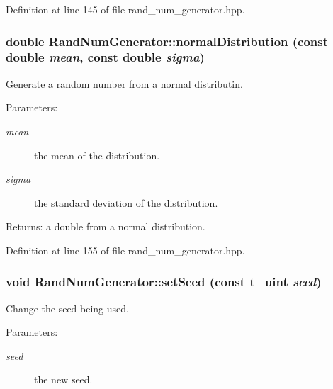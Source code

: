 Definition at line 145 of file rand\_\-num\_\-generator.hpp.
\subsubsection{\setlength{\rightskip}{0pt plus 5cm}double Rand\-Num\-Generator::normal\-Distribution (const double {\em mean}, const double {\em sigma})\hspace{0.3cm}{\tt  [inline]}}\label{classRandNumGenerator_00f7a84700c1222bc3f204574b56fca8}


Generate a random number from a normal distributin. 

\begin{Desc}
\item[Parameters:]
\begin{description}
\item[{\em mean}]the mean of the distribution. \item[{\em sigma}]the standard deviation of the distribution. \end{description}
\end{Desc}
\begin{Desc}
\item[Returns:]a double from a normal distribution. \end{Desc}


Definition at line 155 of file rand\_\-num\_\-generator.hpp.
\subsubsection{\setlength{\rightskip}{0pt plus 5cm}void Rand\-Num\-Generator::set\-Seed (const \bf{t\_\-uint} {\em seed})\hspace{0.3cm}{\tt  [inline]}}\label{classRandNumGenerator_9eccd5378059e094ee3aab931bf28432}


Change the seed being used. 

\begin{Desc}
\item[Parameters:]
\begin{description}
\item[{\em seed}]the new seed. \end{description}
\end{Desc}


